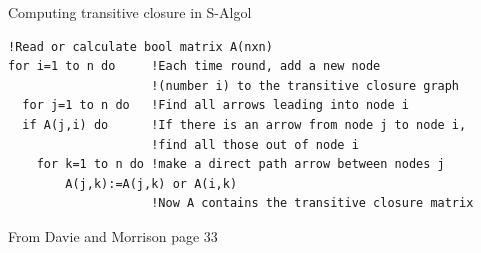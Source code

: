 \documentclass{beamer}
\begin{document}
\begin{frame}[fragile]{Computing transitive closure in S-Algol}
\begin{adjustbox}{max width=0.9\textwidth}
\begin{BVerbatim}
!Read or calculate bool matrix A(nxn)
for i=1 to n do     !Each time round, add a new node
                    !(number i) to the transitive closure graph
  for j=1 to n do   !Find all arrows leading into node i
  if A(j,i) do      !If there is an arrow from node j to node i,
                    !find all those out of node i
    for k=1 to n do !make a direct path arrow between nodes j
        A(j,k):=A(j,k) or A(i,k)
                    !Now A contains the transitive closure matrix
\end{BVerbatim}
\end{adjustbox}

{\tiny From Davie and Morrison page 33}
\end{frame}
\end{document}
